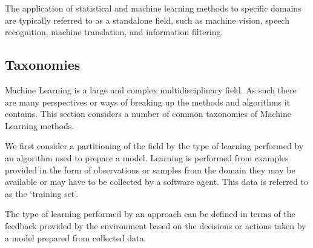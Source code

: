 The application of statistical and machine learning methods to specific domains are typically referred to as a standalone field, such as machine vision, speech recognition, machine translation, and information filtering.

%
%
\subsection{Taxonomies}
\label{sec:taxonomies}
Machine Learning is a large and complex multidisciplinary field. As such there are many perspectives or ways of breaking up the methods and algorithms it contains. This section considers a number of common taxonomies of Machine Learning methods.

We first consider a partitioning of the field by the type of learning performed by an algorithm used to prepare a model. Learning is performed from examples provided in the form of observations or samples from the domain they may be available or may have to be collected by a software agent. This data is referred to as the `training set'. 

The type of learning performed by an approach can be defined in terms of the feedback provided by the environment based on the decisions or actions taken by a model prepared from collected data.

